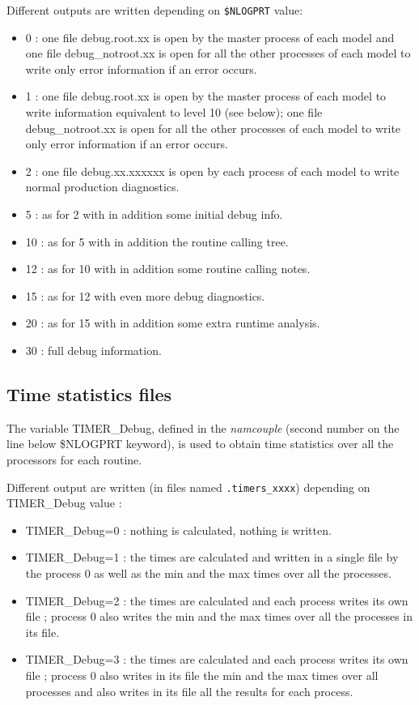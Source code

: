 Different outputs are written depending on {\tt \$NLOGPRT} value:
\begin{itemize}
\item {0} : one file debug.root.xx is open by the master process of
  each model and one file debug\_notroot.xx is open for all the other
  processes of each model to write only error information if an error
  occurs.
\item {1} : one file debug.root.xx is open by the master process of
  each model to write information equivalent to level 10 (see below);
  one file debug\_notroot.xx is open for all the other processes of
  each model to write only error information if an error occurs.
\item {2} : one file debug.xx.xxxxxx is open by each process of each
  model to write normal production diagnostics.
\item {5} : as for 2 with in addition some initial debug info.
\item {10} : as for 5 with in addition the routine calling tree.
\item {12} : as for 10 with in addition some routine calling notes.
\item {15} : as for 12 with even more debug diagnostics.
\item {20} : as for 15 with in addition some extra runtime analysis.
\item {30} : full debug information.
\end{itemize}

\subsection{Time statistics files}
\label{timestat}

The variable TIMER\_Debug, defined in the {\it namcouple} (second
number on the line below \$NLOGPRT keyword), is used to obtain time
statistics over all the processors for each routine.

Different output are written (in files named {\tt *.timers\_xxxx})
depending on TIMER\_Debug value :

\begin{itemize}
\item {TIMER\_Debug=0} : nothing is calculated, nothing is written.
\item {TIMER\_Debug=1} : the times are calculated and written in a
  single file by the process 0 as well as the min and the max times
  over all the processes.
\item {TIMER\_Debug=2} : the times are calculated and each process
  writes its own file ; process 0 also writes the min and the max
  times over all the processes in its file.
\item {TIMER\_Debug=3} : the times are calculated and each process
  writes its own file ; process 0 also writes in its file the min
  and the max times over all processes and also writes in its file
  all the results for each process.
\end{itemize}

